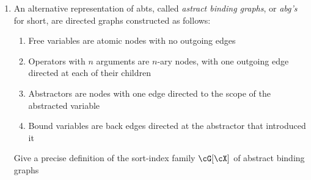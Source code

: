 \documentclass[11pt]{book}
\begin{document}
\begin{enumerate}
    \item[1.4] An alternative representation of abts, called \textit{astract binding graphs}, or \textit{abg's} for short, are directed graphs constructed as follows: 
    \begin{enumerate}
        \item Free variables are atomic nodes with no outgoing edges
        \item Operators with $n$ arguments are $n$-ary nodes, with one outgoing edge directed at each of their children
        \item Abstractors are nodes with one edge directed to the scope of the abstracted variable
        \item Bound variables are back edges directed at the abstractor that introduced it
    \end{enumerate}
    Give a precise definition of the sort-index family $\cG[\cX]$ of abstract binding graphs
\end{enumerate}
\end{document}
